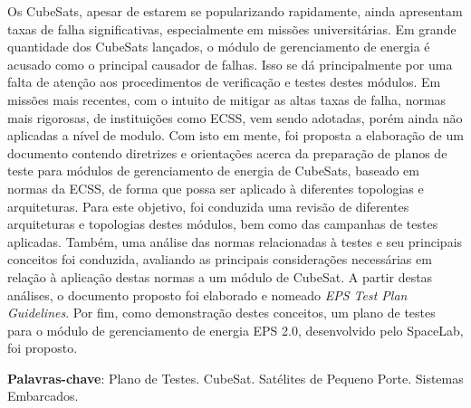 \setlength{\absparsep}{18pt} %
\begin{resumo}
	\SingleSpacing
	Os CubeSats, apesar de estarem se popularizando rapidamente, ainda apresentam taxas de falha significativas, especialmente em missões universitárias. Em grande quantidade dos CubeSats lançados, o módulo de gerenciamento de energia é acusado como o principal causador de falhas. Isso se dá principalmente por uma falta de atenção aos procedimentos de verificação e testes destes módulos. Em missões mais recentes, com o intuito de mitigar as altas taxas de falha, normas mais rigorosas, de instituições como ECSS, vem sendo adotadas, porém ainda não aplicadas a nível de modulo. Com isto em mente, foi proposta a elaboração de um documento contendo diretrizes e orientações acerca da preparação de planos de teste para módulos de gerenciamento de energia de CubeSats, baseado em normas da ECSS, de forma que possa ser aplicado à diferentes topologias e arquiteturas. Para este objetivo, foi conduzida uma revisão de diferentes arquiteturas e topologias destes módulos, bem como das campanhas de testes aplicadas. Também, uma análise das normas relacionadas à testes e seu principais conceitos foi conduzida, avaliando as principais considerações necessárias em relação à aplicação destas normas a um módulo de CubeSat. A partir destas análises, o documento proposto foi elaborado e nomeado \textit{EPS Test Plan Guidelines}. Por fim, como demonstração destes conceitos, um plano de testes para o módulo de gerenciamento de energia EPS 2.0, desenvolvido pelo SpaceLab, foi proposto.
	
	\textbf{Palavras-chave}: Plano de Testes. CubeSat. Satélites de Pequeno Porte. Sistemas Embarcados.
\end{resumo}


